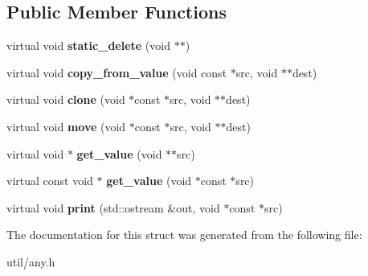 \subsection*{Public Member Functions}
\begin{DoxyCompactItemize}
\item 
\mbox{\label{structtrees_1_1anyimpl_1_1small__any__policy_a88ca9c077624b4396d47259e7ebc4e2a}} 
virtual void {\bfseries static\+\_\+delete} (void $\ast$$\ast$)
\item 
\mbox{\label{structtrees_1_1anyimpl_1_1small__any__policy_a44215871b9ab01baf4be240e87045f26}} 
virtual void {\bfseries copy\+\_\+from\+\_\+value} (void const $\ast$src, void $\ast$$\ast$dest)
\item 
\mbox{\label{structtrees_1_1anyimpl_1_1small__any__policy_ac6333d36ba39556ca71c71e40832adfb}} 
virtual void {\bfseries clone} (void $\ast$const $\ast$src, void $\ast$$\ast$dest)
\item 
\mbox{\label{structtrees_1_1anyimpl_1_1small__any__policy_acefd3b911628bab13d2c678a59025fba}} 
virtual void {\bfseries move} (void $\ast$const $\ast$src, void $\ast$$\ast$dest)
\item 
\mbox{\label{structtrees_1_1anyimpl_1_1small__any__policy_ae6cb7097f85171cef9c31088028e0793}} 
virtual void $\ast$ {\bfseries get\+\_\+value} (void $\ast$$\ast$src)
\item 
\mbox{\label{structtrees_1_1anyimpl_1_1small__any__policy_a9c11969bd2dcc3337f47f1a061c4bcb5}} 
virtual const void $\ast$ {\bfseries get\+\_\+value} (void $\ast$const $\ast$src)
\item 
\mbox{\label{structtrees_1_1anyimpl_1_1small__any__policy_a2046f30eeae5653ae3d5fbd1d53e0ced}} 
virtual void {\bfseries print} (std\+::ostream \&out, void $\ast$const $\ast$src)
\end{DoxyCompactItemize}


The documentation for this struct was generated from the following file\+:\begin{DoxyCompactItemize}
\item 
util/any.\+h\end{DoxyCompactItemize}
